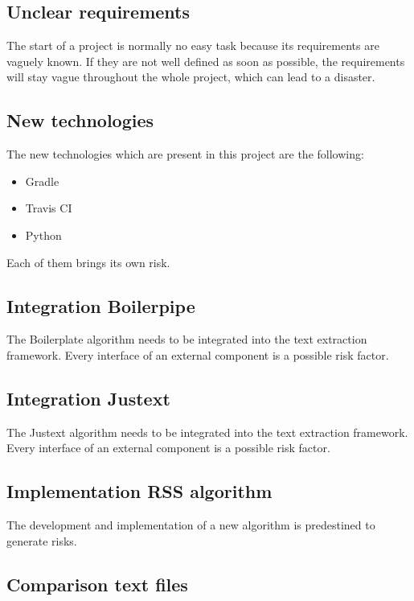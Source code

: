 \subsection{Unclear requirements}

The start of a project is normally no easy task because its requirements are vaguely known. If they are not well defined as soon as possible, the requirements will stay vague throughout the whole project, which can lead to a disaster. 

\subsection{New technologies}

The new technologies which are present in this project are the following:

 \begin{itemize}
    \item Gradle
    \item Travis CI
    \item Python
\end{itemize}

Each of them brings its own risk.

\subsection{Integration Boilerpipe}

The Boilerplate algorithm needs to be integrated into the text extraction framework. Every interface of an external component is a possible risk factor.

\subsection{Integration Justext}


The Justext algorithm needs to be integrated into the text extraction framework. Every interface of an external component is a possible risk factor.


\subsection{Implementation RSS algorithm}

The development and implementation of a new algorithm is predestined to generate risks.

\subsection{Comparison text files}


